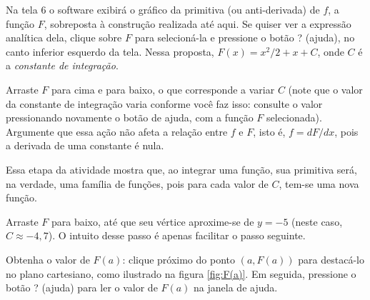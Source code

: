 \documentclass[a4paper,12pt]{scrartcl}
\begin{document}
\begin{list}{.}
      \item Na tela 6 o software exibirá o gráfico da primitiva (ou anti-derivada) de $f$, a função $F$, sobreposta à construção realizada até aqui. Se quiser ver a expressão analítica dela, clique sobre $F$ para selecioná-la e pressione o botão ? (ajuda), no canto inferior esquerdo da tela. Nessa proposta, $F(x) = x^2/2 + x + C$, onde $C$ é a \emph{constante de integração}.
      
      \item Arraste $F$ para cima e para baixo, o que corresponde a variar $C$ (note que o valor da constante de integração varia conforme você faz isso: consulte o valor pressionando novamente o botão de ajuda, com a função $F$ selecionada). Argumente que essa ação não afeta a relação entre $f$ e $F$, isto é, $f = dF/dx$, pois a derivada de uma constante é nula.
      
      Essa etapa da atividade mostra que, ao integrar uma função, sua primitiva será, na verdade, uma família de funções, pois para cada valor de $C$, tem-se uma nova função.
      
      \item \label{step:C} Arraste $F$ para baixo, até que seu vértice aproxime-se de $y = -5$ (neste caso, $C \approx -4,7$). O intuito desse passo é apenas facilitar o passo seguinte.
      
      \item Obtenha o valor de $F(a)$: clique próximo do ponto $\left(a,F(a)\right)$ para destacá-lo no plano cartesiano, como ilustrado na figura \ref{fig:F(a)}. Em seguida, pressione o botão ? (ajuda) para ler o valor de $F(a)$ na janela de ajuda.
      

\end{list}
\end{document}
